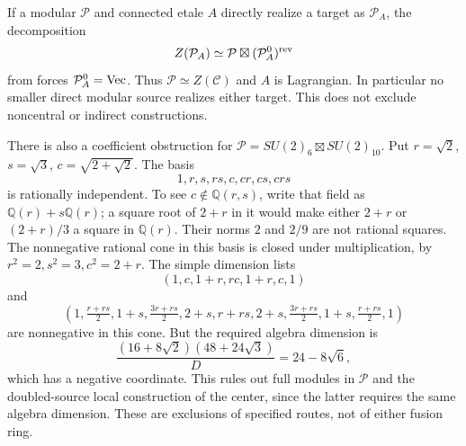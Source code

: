 If a modular $\mathcal P$ and connected etale $A$ directly realize a
target as $\mathcal P_A$, the decomposition
\[
Z(\mathcal P_A)\simeq\mathcal P\boxtimes(\mathcal P_A^0)^{\rm rev}
\]
from \cite[Corollary~3.30]{DMNO} forces $\mathcal P_A^0=\Vec$.
Thus $\mathcal P\simeq Z(\mathcal C)$ and $A$ is Lagrangian. In
particular no smaller direct modular source realizes either target.
This does not exclude noncentral or indirect constructions.

There is also a coefficient obstruction for
$\mathcal P=SU(2)_6\boxtimes SU(2)_{10}$. Put
$r=\sqrt2$, $s=\sqrt3$, $c=\sqrt{2+\sqrt2}$. The basis
\[
1,r,s,rs,c,cr,cs,crs
\]
is rationally independent. To see $c\notin\mathbb Q(r,s)$, write that
field as $\mathbb Q(r)+s\mathbb Q(r)$; a square root of $2+r$ in it
would make either $2+r$ or $(2+r)/3$ a square in $\mathbb Q(r)$.
Their norms $2$ and $2/9$ are not rational squares.
The nonnegative rational cone in this basis is closed under
multiplication, by $r^2=2,s^2=3,c^2=2+r$.
The simple dimension lists
\[
(1,c,1+r,rc,1+r,c,1)
\]
and
\[
\left(1,\tfrac{r+rs}{2},1+s,\tfrac{3r+rs}{2},2+s,r+rs,
 2+s,\tfrac{3r+rs}{2},1+s,\tfrac{r+rs}{2},1\right)
\]
are nonnegative in this cone. But the required algebra dimension is
\[
\frac{(16+8\sqrt2)(48+24\sqrt3)}{D}=24-8\sqrt6,
\]
which has a negative coordinate. This rules out full modules in
$\mathcal P$ and the doubled-source local construction of the center,
since the latter requires the same algebra dimension. These are
exclusions of specified routes, not of either fusion ring.
